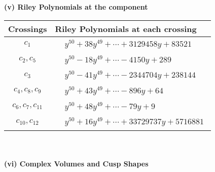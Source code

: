 \documentclass[1p]{elsarticle_modified}
\theoremstyle{definition}
\begin{document}
\newpage\renewcommand{\arraystretch}{1}
\flushleft \textbf{(v) Riley Polynomials at the component}\newline \\
\begin{tabular}{m{50pt}|m{274pt}}
Crossings & \hspace{64pt}Riley Polynomials at each crossing \\
\hline $$\begin{aligned}c_{1}\end{aligned}$$&$\begin{aligned}
&y^{50}+38 y^{49}+\cdots+3129458 y+83521
\end{aligned}$\\
\hline $$\begin{aligned}c_{2},c_{5}\end{aligned}$$&$\begin{aligned}
&y^{50}-18 y^{49}+\cdots-4150 y+289
\end{aligned}$\\
\hline $$\begin{aligned}c_{3}\end{aligned}$$&$\begin{aligned}
&y^{50}-41 y^{49}+\cdots-2344704 y+238144
\end{aligned}$\\
\hline $$\begin{aligned}c_{4},c_{8},c_{9}\end{aligned}$$&$\begin{aligned}
&y^{50}+43 y^{49}+\cdots-896 y+64
\end{aligned}$\\
\hline $$\begin{aligned}c_{6},c_{7},c_{11}\end{aligned}$$&$\begin{aligned}
&y^{50}+48 y^{49}+\cdots-79 y+9
\end{aligned}$\\
\hline $$\begin{aligned}c_{10},c_{12}\end{aligned}$$&$\begin{aligned}
&y^{50}+16 y^{49}+\cdots+33729737 y+5716881
\end{aligned}$\\
\hline
\end{tabular}\\~\\
\newpage\flushleft \textbf{(vi) Complex Volumes and Cusp Shapes}
\end{document}
